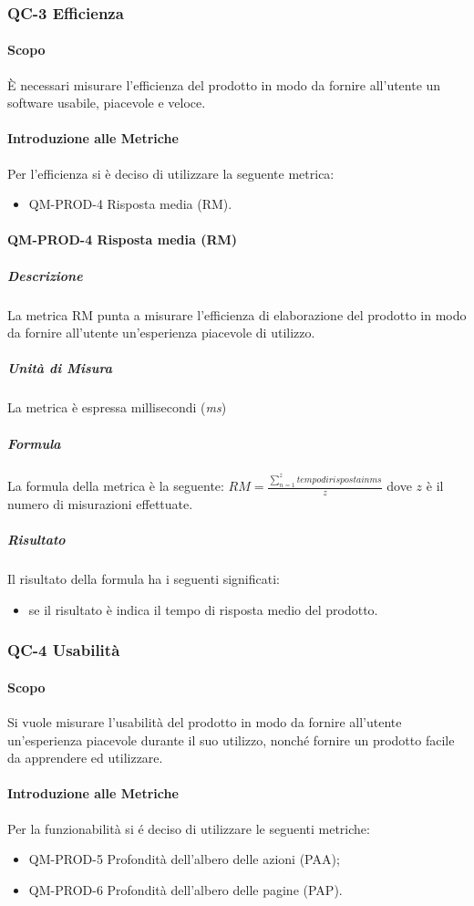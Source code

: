 	\subsubsection{QC-3 Efficienza}
		\paragraph{Scopo}
			È necessari misurare l'efficienza del prodotto in modo da fornire all'utente un software usabile, piacevole e veloce.
		\paragraph{Introduzione alle Metriche}
			Per l'efficienza si è deciso di utilizzare la seguente metrica:
			\begin{itemize}
				\item QM-PROD-4 Risposta media (RM).
			\end{itemize}
		\paragraph{QM-PROD-4 Risposta media (RM)}
			\subparagraph{Descrizione}
				La metrica RM punta a misurare l'efficienza di elaborazione del prodotto in modo da fornire all'utente un'esperienza piacevole di utilizzo.
			\subparagraph{Unità di Misura}
				La metrica è espressa millisecondi (\textit{ms})
			\subparagraph{Formula}
				La formula della metrica è la seguente:
				\(
					RM = \frac{\sum_{n=1}^{z} tempo di risposta in ms}{z}
				\)
				dove $z$ è il numero di misurazioni effettuate.
			\subparagraph{Risultato}
				Il risultato della formula ha i seguenti significati:
				\begin{itemize}
					\item se il risultato è indica il tempo di risposta medio del prodotto.
				\end{itemize}

	\subsubsection{QC-4 Usabilità}
		\paragraph{Scopo}
		Si vuole misurare l'usabilità del prodotto in modo da fornire all'utente un'esperienza piacevole durante il suo utilizzo, nonché fornire un prodotto facile da apprendere ed utilizzare.
		\paragraph{Introduzione alle Metriche}
			Per la funzionabilità si é deciso di utilizzare le seguenti metriche:
			\begin{itemize}
				\item QM-PROD-5 Profondità dell'albero delle azioni (PAA);
				\item QM-PROD-6 Profondità dell'albero delle pagine (PAP).
			\end{itemize}
